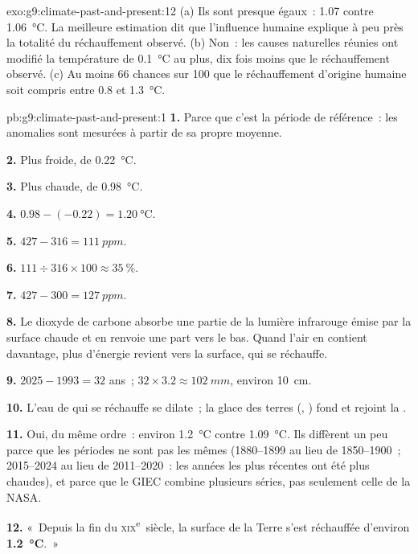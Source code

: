 \begin{solution}{exo:g9:climate-past-and-present:12}
(a) Ils sont presque égaux~: 1.07 contre \qty{1.06}{\degreeCelsius}. La
meilleure estimation dit que l'influence humaine explique à peu près la
totalité du réchauffement observé. (b) Non~: les causes naturelles réunies
ont modifié la température de \qty{0.1}{\degreeCelsius} au plus, dix fois
moins que le réchauffement observé. (c) Au moins 66 chances sur 100 que le
réchauffement d'origine humaine soit compris entre 0.8 et
\qty{1.3}{\degreeCelsius}.
\end{solution}

\begin{solution}{pb:g9:climate-past-and-present:1}
\textbf{1.} Parce que c'est la période de référence~: les anomalies sont
mesurées à partir de sa propre moyenne.

\textbf{2.} Plus froide, de \qty{0.22}{\degreeCelsius}.

\textbf{3.} Plus chaude, de \qty{0.98}{\degreeCelsius}.

\textbf{4.} $0.98 - (-0.22) = \qty{1.20}{\degreeCelsius}$.

\textbf{5.} $427 - 316 = \qty{111}{ppm}$.

\textbf{6.} $111 \div 316 \times 100 \approx 35~\%$.

\textbf{7.} $427 - 300 = \qty{127}{ppm}$.

\textbf{8.} Le dioxyde de carbone absorbe une partie de la lumière
infrarouge émise par la surface chaude et en renvoie une part vers le bas.
Quand l'air en contient davantage, plus d'énergie revient vers la surface,
qui se réchauffe.

\textbf{9.} $2025 - 1993 = 32$ ans~; $32 \times 3.2 \approx
\qty{102}{mm}$, environ \qty{10}{cm}.

\textbf{10.} L'eau de  qui se réchauffe se dilate~; la glace des terres
(, ) fond et rejoint la .

\textbf{11.} Oui, du même ordre~: environ \qty{1.2}{\degreeCelsius} contre
\qty{1.09}{\degreeCelsius}. Ils diffèrent un peu parce que les périodes ne
sont pas les mêmes (1880--1899 au lieu de 1850--1900~; 2015--2024 au lieu
de 2011--2020~: les années les plus récentes ont été plus chaudes), et
parce que le GIEC combine plusieurs séries, pas seulement celle de la
NASA.

\textbf{12.} «~Depuis la fin du \textsc{xix}\textsuperscript{e}~siècle, la
surface de la Terre s'est réchauffée d'environ
\textbf{\qty{1.2}{\degreeCelsius}}.~»
\end{solution}
